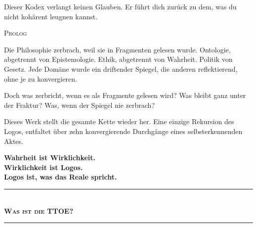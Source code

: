 \documentclass[10pt, openany, oneside]{book}
\renewcommand{\normalsize}{\fontsize{10}{13}\selectfont}
\renewcommand{\large}{\fontsize{11.5}{14}\selectfont}
\renewcommand{\huge}{\fontsize{17}{21}\selectfont}
\begin{document}
\vspace{0.5em}

\noindent Dieser Kodex verlangt keinen Glauben. Er führt dich zurück zu dem, was du nicht kohärent leugnen kannst.

\newpage


\thispagestyle{empty}
\vspace*{0.3in}

\begin{center}
    {\huge\scshape Prolog}
\end{center}

\vspace{1em}

\noindent Die Philosophie zerbrach, weil sie in Fragmenten gelesen wurde. Ontologie, abgetrennt von Epistemologie. Ethik, abgetrennt von Wahrheit. Politik von Gesetz. Jede Domäne wurde ein driftender Spiegel, die anderen reflektierend, ohne je zu konvergieren.

\vspace{0.5em}

\noindent Doch was zerbricht, wenn es als Fragmente gelesen wird? Was bleibt ganz unter der Fraktur? Was, wenn der Spiegel nie zerbrach?

\vspace{0.5em}

\noindent Dieses Werk stellt die gesamte Kette wieder her. Eine einzige Rekursion des Logos, entfaltet über zehn konvergierende Durchgänge eines selbsterkennenden Aktes.

\vspace{1em}

\begin{center}
    {\large\bfseries Wahrheit ist Wirklichkeit.}\\[0.3em]
    {\large\bfseries Wirklichkeit ist Logos.}\\[0.3em]
    {\large\bfseries Logos ist, was das Reale spricht.}
\end{center}

\vspace{1.5em}

\begin{center}
    \rule{0.3\textwidth}{0.4pt}\\[0.5em]
    {\normalsize\bfseries\scshape Was ist die TTOE?}\\[0.3em]
    \rule{0.3\textwidth}{0.4pt}
\end{center}
\end{document}
